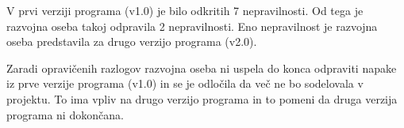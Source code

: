 \documentclass[a4paper,12pt]{article}
\begin{document}
		\vspace{0.5cm}

		\hspace{-0.8cm} 
		
		\vspace{0.3cm}

		\qquad V prvi verziji programa (v1.0) je bilo odkritih 7 nepravilnosti. Od tega je 
				razvojna oseba takoj odpravila 2 nepravilnosti. Eno nepravilnost je razvojna
				oseba predstavila za drugo verzijo programa (v2.0). 

		\qquad	Zaradi opravičenih razlogov razvojna oseba ni uspela do konca odpraviti napake 
		iz prve verzije programa (v1.0) in se je odločila da več ne bo sodelovala v projektu. 
		To ima vpliv na drugo verzijo programa in to pomeni da druga verzija programa ni dokončana.

\newpage
\end{document}
